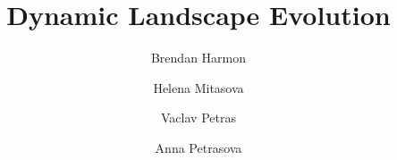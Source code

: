\documentclass[final,3p,times,twocolumn]{elsarticle}
\begin{document}
\begin{frontmatter}

\title{Dynamic Landscape Evolution}

\author[cga,la]{Brendan Harmon}

\author[cga,meas]{Helena Mitasova}

\author[cga,meas]{Vaclav Petras}

\author[cga,meas]{Anna Petrasova}

\address[cga]{Center for Geospatial Analytics, North Carolina State University, Raleigh, North Carolina, United States of America}
\address[la]{Robert Reich School of Landscape Architecture, Louisiana State University, Baton Rouge, Louisiana}
\address[meas]{Department of Marine, Earth, and Atmospheric Sciences, North Carolina State University, Raleigh, North Carolina, United States of America}


\end{frontmatter}
\end{document}
